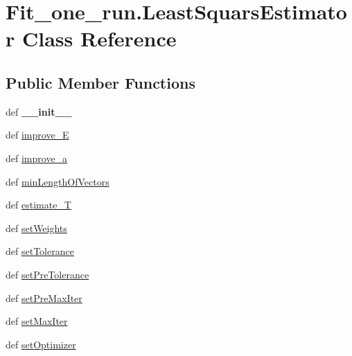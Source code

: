 \hypertarget{classFit__one__run_1_1LeastSquarsEstimator}{\section{\-Fit\-\_\-one\-\_\-run.\-Least\-Squars\-Estimator \-Class \-Reference}
\label{classFit__one__run_1_1LeastSquarsEstimator}
}
\subsection*{\-Public \-Member \-Functions}
\begin{DoxyCompactItemize}
\item 
\hypertarget{classFit__one__run_1_1LeastSquarsEstimator_a09cf826efd598ffb6feec79625b4ed4d}{def {\bfseries \-\_\-\-\_\-init\-\_\-\-\_\-}}\label{classFit__one__run_1_1LeastSquarsEstimator_a09cf826efd598ffb6feec79625b4ed4d}

\item 
def \hyperlink{classFit__one__run_1_1LeastSquarsEstimator_a48dc60c2b33c7edefff0f4b681d4aaaf}{improve\-\_\-\-E}
\item 
def \hyperlink{classFit__one__run_1_1LeastSquarsEstimator_af4414727354bef5768acc922ec0a73e1}{improve\-\_\-a}
\item 
def \hyperlink{classFit__one__run_1_1LeastSquarsEstimator_a7e73c426cae3c8ef17e491c788c7d566}{min\-Length\-Of\-Vectors}
\item 
def \hyperlink{classFit__one__run_1_1LeastSquarsEstimator_a2e0ebf44d3f8daf9abdf97b34ad1b223}{estimate\-\_\-\-T}
\item 
def \hyperlink{classFit__one__run_1_1LeastSquarsEstimator_ad33da5dec1f154ada513aa275614bec7}{set\-Weights}
\item 
def \hyperlink{classFit__one__run_1_1LeastSquarsEstimator_afca1605047fe21a62dd7d6d419ddbd1d}{set\-Tolerance}
\item 
def \hyperlink{classFit__one__run_1_1LeastSquarsEstimator_a20db3986db94d98df8ecff33c6addfa4}{set\-Pre\-Tolerance}
\item 
def \hyperlink{classFit__one__run_1_1LeastSquarsEstimator_a56e603da8e27957b7aee41db69a3b6c5}{set\-Pre\-Max\-Iter}
\item 
def \hyperlink{classFit__one__run_1_1LeastSquarsEstimator_ae279fba46afb9295bb480f5105becdd2}{set\-Max\-Iter}
\item 
def \hyperlink{classFit__one__run_1_1LeastSquarsEstimator_a230152154dd1531bb07d13265fea06b8}{set\-Optimizer}
\end{DoxyCompactItemize}
